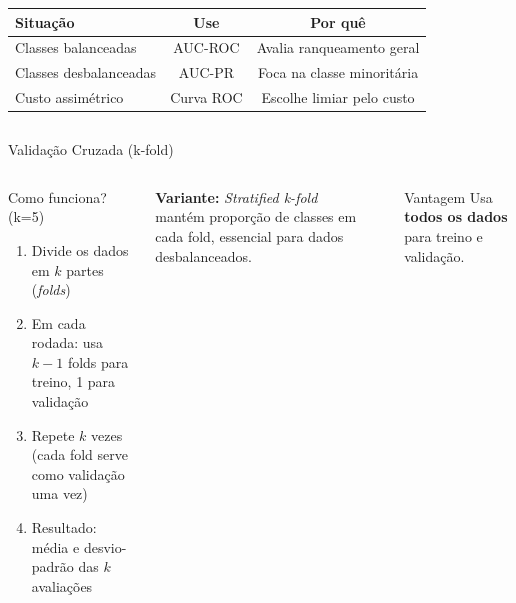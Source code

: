 \documentclass[aspectratio=169]{beamer}
\begin{document}
\begin{frame}{}
\begin{columns}[T]
\vspace{0.3em}
\begin{center}
\small
\begin{tabular}{lcc}
\toprule
\textbf{Situação} & \textbf{Use} & \textbf{Por quê} \\
\midrule
Classes balanceadas & AUC-ROC & Avalia ranqueamento geral \\
Classes desbalanceadas & AUC-PR & Foca na classe minoritária \\
Custo assimétrico & Curva ROC & Escolhe limiar pelo custo \\
\bottomrule
\end{tabular}
\end{center}

\end{columns}
\end{frame}

\begin{frame}{Validação Cruzada (k-fold)}
  \footnotesize

\begin{columns}[T]
\begin{block}{Como funciona? (k=5)}
\begin{enumerate}
  \item Divide os dados em $k$ partes (\textit{folds})
  \item Em cada rodada: usa $k-1$ folds para treino, 1 para validação
  \item Repete $k$ vezes (cada fold serve como validação uma vez)
  \item Resultado: média e desvio-padrão das $k$ avaliações
\end{enumerate}
\end{block}
\vspace{0.3em}
\textbf{Variante:} \textit{Stratified k-fold} mantém proporção de classes em cada fold, essencial para dados desbalanceados.

\begin{center}
\end{center}
\vspace{0.2em}
\begin{exampleblock}{Vantagem}
  Usa \textbf{todos os dados} para treino e validação.
\end{exampleblock}
\end{columns}
\end{frame}
\end{document}
